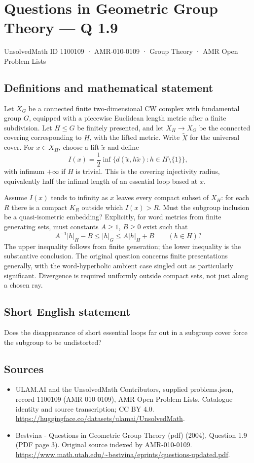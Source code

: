 \documentclass[11pt,a4paper]{article}
\begin{document}
\section*{Questions in Geometric Group Theory — Q 1.9}\label{1100109}
{\small UnsolvedMath ID 1100109 · AMR-010-0109 · Group Theory · AMR Open Problem Lists}
\subsection{Definitions and mathematical statement}
Let $X_G$ be a connected finite two-dimensional CW complex with fundamental group $G$, equipped with a piecewise Euclidean length metric after a finite subdivision. Let $H\leq G$ be finitely presented, and let $X_H\to X_G$ be the connected covering corresponding to $H$, with the lifted metric. Write $\widetilde X$ for the universal cover. For $x\in X_H$, choose a lift $\widetilde x$ and define
\[
 I(x)=\frac12\inf\{d(\widetilde x,h\widetilde x):h\in H\setminus\{1\}\},
\]
with infimum $+\infty$ if $H$ is trivial. This is the covering injectivity radius, equivalently half the infimal length of an essential loop based at $x$.

Assume $I(x)$ tends to infinity as $x$ leaves every compact subset of $X_H$: for each $R$ there is a compact $K_R$ outside which $I(x)>R$. Must the subgroup inclusion be a quasi-isometric embedding? Explicitly, for word metrics from finite generating sets, must constants $A\geq1$, $B\geq0$ exist such that
\[
 A^{-1}|h|_H-B\leq |h|_G\leq A|h|_H+B\qquad(h\in H)?
\]
The upper inequality follows from finite generation; the lower inequality is the substantive conclusion. The original question concerns finite presentations generally, with the word-hyperbolic ambient case singled out as particularly significant. Divergence is required uniformly outside compact sets, not just along a chosen ray.
\subsection{Short English statement}
Does the disappearance of short essential loops far out in a subgroup cover force the subgroup to be undistorted?
\subsection{Sources}
\begin{itemize}
\item[S1] ULAM.AI and the UnsolvedMath Contributors, supplied problems.json, record 1100109 (AMR-010-0109), AMR Open Problem Lists. Catalogue identity and source transcription; CC BY 4.0.
\url{https://huggingface.co/datasets/ulamai/UnsolvedMath}.
\item[S2] Bestvina - Questions in Geometric Group Theory (pdf) (2004), Question 1.9 (PDF page 3). Original source indexed by AMR-010-0109.
\url{https://www.math.utah.edu/~bestvina/eprints/questions-updated.pdf}.
\end{itemize}
\end{document}
